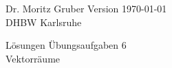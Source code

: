 




\vspace*{-20mm}
{
	\color{dhbwGray}
	Dr. Moritz Gruber	\hfill Version \today\\
	DHBW Karlsruhe\\
}

\vspace{10mm}
\begin{center}
	{
		\color{lightBlue}
		{ \LARGE L\"osungen \"Ubungsaufgaben 6}\\[3mm]
		{\Large Vektorr\"aume}
	}
\end{center}

\vspace{5mm}


